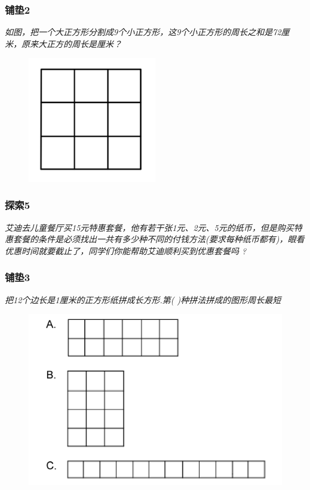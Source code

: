 \begin{frame}
    \frametitle{铺垫2}
    \textit{如图，把一个大正方形分割成9个小正方形，这9个小正方形的周长之和是72厘米，原来大正方的周长是厘米？}
    \begin{figure}[H] 
        \centering
        \includegraphics[width=0.5\textwidth]{./pics/Chapter_1/pudian2.png}
    \end{figure}
\end{frame}

\begin{frame}
    \frametitle{探索5}
    \textit{艾迪去儿童餐厅买15元特惠套餐，他有若干张1元、2元、5元的纸币，但是购买特惠套餐的条件是必须找出一共有多少种不同的付钱方法(要求每种纸币都有)，眼看优惠时间就要截止了，同学们你能帮助艾迪顺利买到优惠套餐吗 ?}
\end{frame}

\begin{frame}
    \frametitle{铺垫3}
    \textit{把12个边长是1厘米的正方形纸拼成长方形.第( )种拼法拼成的图形周长最短}
    \begin{figure}[H] 
        \centering
        \includegraphics[width=1\textwidth]{./pics/Chapter_1/pudian3.png}
    \end{figure}
\end{frame}

